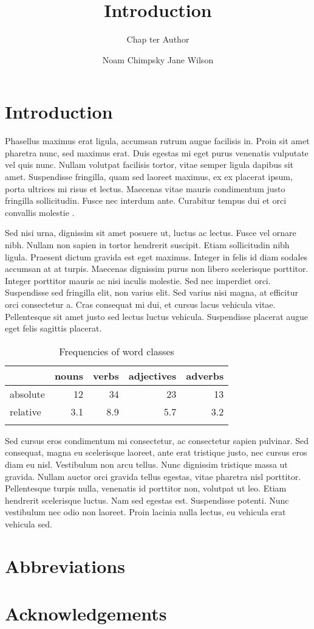 \documentclass[output=paper]{langscibook}
\title{Introduction}
\author{%
 Chap ter Author\affiliation{University of Eden}\and
 Noam Chimpsky\affiliation{University of Pluto}\lastand
 Jane Wilson\affiliation{National Institute for Language}
}
\begin{document}
\maketitle
\section{Introduction}
Phasellus maximus erat ligula, accumsan rutrum augue facilisis in. Proin sit amet pharetra nunc, sed maximus erat. Duis egestas mi eget purus venenatis vulputate vel quis nunc. Nullam volutpat facilisis tortor, vitae semper ligula dapibus sit amet. Suspendisse fringilla, quam sed laoreet maximus, ex ex placerat ipsum, porta ultrices mi risus et lectus. Maecenas vitae mauris condimentum justo fringilla sollicitudin. Fusce nec interdum ante. Curabitur tempus dui et orci convallis molestie \citep{Chomsky1957}.



Sed nisi urna, dignissim sit amet posuere ut, luctus ac lectus. Fusce vel ornare nibh. Nullam non sapien in tortor hendrerit suscipit. Etiam sollicitudin nibh ligula. Praesent dictum gravida est eget maximus. Integer in felis id diam sodales accumsan at at turpis. Maecenas dignissim purus non libero scelerisque porttitor. Integer porttitor mauris ac nisi iaculis molestie. Sed nec imperdiet orci. Suspendisse sed fringilla elit, non varius elit. Sed varius nisi magna, at efficitur orci consectetur a. Cras consequat mi dui, et cursus lacus vehicula vitae. Pellentesque sit amet justo sed lectus luctus vehicula. Suspendisse placerat augue eget felis sagittis placerat.


\begin{table}
\caption{Frequencies of word classes}
\label{tab:1:frequencies}
 \begin{tabular}{lrrrr}
  \lsptoprule
            & nouns & verbs & adjectives & adverbs\\
  \midrule
  absolute  &   12 &    34  &    23     & 13\\
  relative  &   3.1 &   8.9 &    5.7    & 3.2\\
  \lspbottomrule
 \end{tabular}
\end{table}


Sed cursus eros condimentum mi consectetur, ac consectetur sapien pulvinar. Sed consequat, magna eu scelerisque laoreet, ante erat tristique justo, nec cursus eros diam eu nisl. Vestibulum non arcu tellus. Nunc dignissim tristique massa ut gravida. Nullam auctor orci gravida tellus egestas, vitae pharetra nisl porttitor. Pellentesque turpis nulla, venenatis id porttitor non, volutpat ut leo. Etiam hendrerit scelerisque luctus. Nam sed egestas est. Suspendisse potenti. Nunc vestibulum nec odio non laoreet. Proin lacinia nulla lectus, eu vehicula erat vehicula sed.

\section*{Abbreviations}
\section*{Acknowledgements}

\printbibliography[heading=subbibliography,notkeyword=this]
\end{document}
